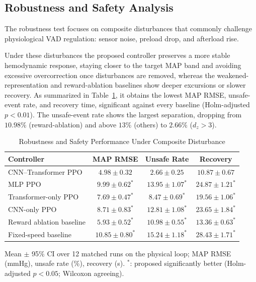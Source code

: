 \documentclass[sigconf]{acmart}
\begin{document}
\subsection{Robustness and Safety Analysis}
\label{sec:results_robustness}
The robustness test focuses on composite disturbances that commonly challenge physiological VAD regulation: sensor noise, preload drop, and afterload rise.

Under these disturbances the proposed controller preserves a more stable hemodynamic response, staying closer to the target MAP band and avoiding excessive overcorrection once disturbances are removed, whereas the weakened-representation and reward-ablation baselines show deeper excursions or slower recovery. As summarized in Table~\ref{tab:robustness_results}, it obtains the lowest MAP RMSE, unsafe-event rate, and recovery time, significant against every baseline (Holm-adjusted $p<0.01$). The unsafe-event rate shows the largest separation, dropping from $10.98\%$ (reward-ablation) and above $13\%$ (others) to $2.66\%$ ($d_z>3$).

\begin{table}[!htbp]
\caption{Robustness and Safety Performance Under Composite Disturbance}
\label{tab:robustness_results}
\centering
\footnotesize
\setlength{\tabcolsep}{3pt}
\begin{tabular}{lccc}
\toprule
\textbf{Controller} & \textbf{MAP RMSE} & \textbf{Unsafe Rate} & \textbf{Recovery} \\
\midrule
CNN--Transformer PPO & $4.98 \pm 0.32$ & $2.66 \pm 0.25$ & $10.87 \pm 0.67$ \\
MLP PPO & $9.99 \pm 0.62^{*}$ & $13.95 \pm 1.07^{*}$ & $24.87 \pm 1.21^{*}$ \\
Transformer-only PPO & $7.69 \pm 0.47^{*}$ & $8.47 \pm 0.69^{*}$ & $19.56 \pm 1.06^{*}$ \\
CNN-only PPO & $8.71 \pm 0.83^{*}$ & $12.81 \pm 1.08^{*}$ & $23.65 \pm 1.84^{*}$ \\
Reward ablation baseline & $5.93 \pm 0.52^{*}$ & $10.98 \pm 0.55^{*}$ & $13.36 \pm 0.63^{*}$ \\
Fixed-speed baseline & $10.85 \pm 0.80^{*}$ & $15.24 \pm 1.18^{*}$ & $28.43 \pm 1.71^{*}$ \\
\bottomrule
\end{tabular}
\par\smallskip
{\scriptsize Mean $\pm$ 95\% CI over 12 matched runs on the physical loop; MAP RMSE (mmHg), unsafe rate (\%), recovery (s). $^{*}$: proposed significantly better (Holm-adjusted $p<0.05$; Wilcoxon agreeing).\par}
\end{table}
\end{document}
